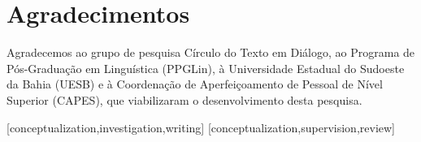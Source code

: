 \documentclass[portuguese]{textolivre}
\begin{document}
\begin{polyabstract}
\begin{english}
\begin{abstract}
\end{abstract}
\end{english}
\end{polyabstract}








\section{Agradecimentos}\label{sec-thanks}

Agradecemos ao grupo de pesquisa Círculo do Texto em Diálogo, ao
Programa de Pós-Graduação em Linguística (PPGLin), à Universidade
Estadual do Sudoeste da Bahia (UESB) e à Coordenação de Aperfeiçoamento
de Pessoal de Nível Superior (CAPES), que viabilizaram o desenvolvimento
desta pesquisa.


\printbibliography\label{sec-bib}
\begin{contributors}
[conceptualization,investigation,writing]
[conceptualization,supervision,review]
\end{contributors}
\end{document}
